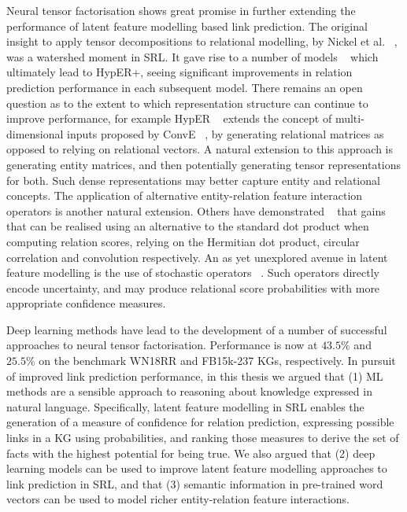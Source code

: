 \noindent Neural tensor factorisation shows great promise in further extending the performance of latent feature modelling based link prediction. The original insight to apply tensor decompositions to relational modelling, by Nickel et al. \unskip~\citep{nickel2011three}, was a watershed moment in SRL. It gave rise to a number of models \unskip~\citep{bordes2011learning, jenatton2012latent, socher2013reasoning, trouillon2016complex, hohenecker2017deep, dettmers2018convolutional, balazevic2019hypernetwork} which ultimately lead to HypER+, seeing significant improvements in relation prediction performance in each subsequent model. There remains an open question as to the extent to which representation structure can continue to improve performance, for example HypER \unskip~\citep{balazevic2019hypernetwork} extends the concept of multi-dimensional inputs proposed by ConvE \unskip~\citep{dettmers2018convolutional}, by generating relational matrices as opposed to relying on relational vectors. A natural extension to this approach is generating entity matrices, and then potentially generating tensor representations for both. Such dense representations may better capture entity and relational concepts. The application of alternative entity-relation feature interaction operators is another natural extension. Others have demonstrated \unskip~\citep{trouillon2016complex, nickel2016holographic, dettmers2018convolutional} that gains that can be realised using an alternative to the standard dot product when computing relation scores, relying on the Hermitian dot product, circular correlation and convolution respectively. An as yet unexplored avenue in latent feature modelling is the use of stochastic operators \unskip~\citep{kingma2013auto}. Such operators directly encode uncertainty, and may produce relational score probabilities with more appropriate confidence measures. \par

\noindent Deep learning methods have lead to the development of a number of successful approaches to neural tensor factorisation. Performance is now at $ 43.5\% $ and $ 25.5\% $ on the benchmark WN18RR and FB15k-237 KGs, respectively. In pursuit of improved link prediction performance, in this thesis we argued that (1) ML methods are a sensible approach to reasoning about knowledge expressed in natural language. Specifically, latent feature modelling in SRL enables the generation of a measure of confidence for relation prediction, expressing possible links in a KG using probabilities, and ranking those measures to derive the set of facts with the highest potential for being true. We also argued that (2) deep learning models can be used to improve latent feature modelling approaches to link prediction in SRL, and that (3) semantic information in pre-trained word vectors can be used to model richer entity-relation feature interactions. \par

